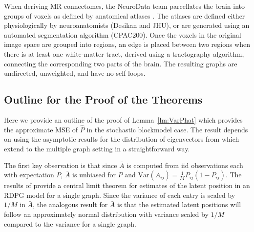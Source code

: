 \documentclass[10pt,letterpaper]{article}
\renewcommand{\hat}{\widehat}
\begin{document}
When deriving MR connectomes, the NeuroData team parcellates the brain into groups of voxels as defined by anatomical atlases \citep{neurodata, kiar2016graph}. The atlases are defined either physiologically by neuroanatomists (Desikan and JHU), or are generated using an automated segmentation algorithm (CPAC200).
Once the voxels in the original image space are grouped into regions, an edge is placed between two regions when there is at least one white-matter tract, derived using a tractography algorithm, connecting the corresponding two parts of the brain.
The resulting graphs are undirected, unweighted, and have no self-loops.


\subsection{Outline for the Proof of the Theorems}
\label{section:outline_proof}
Here we provide an outline of the proof of Lemma~\ref{lm:VarPhat} which provides the approximate MSE of $\hat{P}$ in the stochastic blockmodel case.
The result depends on using the asymptotic results for the distribution of eigenvectors from \citet{athreya2013limit} which extend to the multiple graph setting in a straightforward way.

The first key observation is that since $\bar{A}$ is computed from iid observations each with expectation $P$, $\bar{A}$ is unbiased for $P$ and $\mathrm{Var}(A_{ij}) = \frac{1}{M}P_{ij}(1-P_{ij})$.
The results of \citet{athreya2013limit} provide a central limit theorem for estimates of the latent position in an RDPG model for a single graph.
Since the variance of each entry is scaled by $1/M$ in $\bar{A}$, the analogous result for $\bar{A}$ is that the estimated latent positions will follow an approximately normal distribution with variance scaled by $1/M$ compared to the variance for a single graph. 
    

\end{document}

